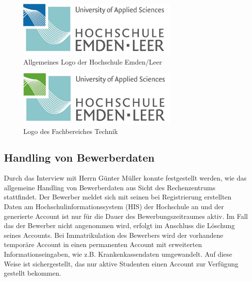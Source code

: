\begin{figure}[h!]
	\centering
	\includegraphics[width=8cm]{kapitel/gruppe2/bilder/hs_logo_allgemein}
	\caption{Allgemeines Logo der Hochschule Emden/Leer}
	\label{fig_logo_allgemein}
\end{figure}

\begin{figure}[h!]
	\centering
	\includegraphics[width=8cm]{kapitel/gruppe2/bilder/hs_logo_technik}
	\caption{Logo des Fachbereiches Technik}
	\label{fig_logo_fb_technik}
\end{figure}

\subsection{Handling von Bewerberdaten}
Durch das Interview mit Herrn Günter Müller konnte festgestellt werden, wie das allgemeine Handling von Bewerberdaten aus Sicht des Rechenzentrums stattfindet. 
Der Bewerber meldet sich mit seinen bei Registrierung erstellten Daten am Hochschulinformationssystem (HIS) der Hochschule an und der generierte Account ist nur für die Dauer des Bewerbungszeitraumes aktiv. Im Fall das der Bewerber nicht angenommen wird, erfolgt im Anschluss die Löschung seines Accounts. Bei Immatrikulation des Bewerbers wird der vorhandene temporäre Account in einen permanenten Account mit erweiterten Informationseingaben, wie z.B. Krankenkassendaten umgewandelt. Auf diese Weise ist sichergestellt, das nur aktive Studenten einen Account zur Verfügung gestellt bekommen. 